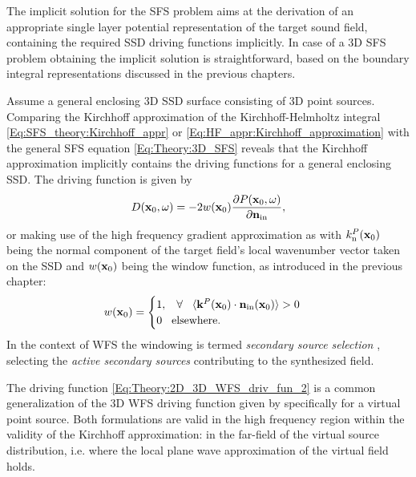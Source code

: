 The implicit solution for the SFS problem aims at the derivation of an appropriate single layer potential representation of the target sound field, containing the required SSD driving functions implicitly.
In case of a 3D SFS problem obtaining the implicit solution is straightforward, based on the boundary integral representations discussed in the previous chapters.

Assume a general enclosing 3D SSD surface consisting of 3D point sources.
Comparing the Kirchhoff approximation of the Kirchhoff-Helmholtz integral \eqref{Eq:SFS_theory:Kirchhoff_appr} or \eqref{Eq:HF_appr:Kirchhoff_approximation} with the general SFS equation \eqref{Eq:Theory:3D_SFS} reveals that the Kirchhoff approximation implicitly contains the driving functions for a general enclosing SSD. 
The driving function is given by
\begin{equation}
D(\mathbf{x}_0,\omega) = - 2w(\mathbf{x}_0)\frac{\partial P(\mathbf{x}_0,\omega)}{\partial \mathbf{n}_{\mathrm{in}}}, 
\label{Eq:Theory:2D_3D_WFS_driv_fun}
\end{equation}
or making use of the high frequency gradient approximation as
with $k_{\mathrm{n}}^P(\mathbf{x}_0)$ being the normal component of the target field's local wavenumber vector taken on the SSD and $w(\mathbf{x}_0)$ being the window function, as introduced in the previous chapter:
\begin{equation}
w(\mathbf{x}_0) = \begin{cases}
                        1, \hspace{3mm} \forall \hspace{3mm} \langle \mathbf{k}^P(\mathbf{x}_0) \cdot \mathbf{n}_{\text{in}}(\mathbf{x}_0) \rangle > 0 \\
                        0  \hspace{3mm} \text{elsewhere}.
                    \end{cases}
\end{equation}
In the context of WFS the windowing is termed \emph{secondary source selection} \cite{nicol19993d, Spors2007:DAGA:SS_selection_criterion, Spors2007}, selecting the \emph{active secondary sources} contributing to the synthesized field.

The driving function \eqref{Eq:Theory:2D_3D_WFS_driv_fun_2} is a common generalization of the 3D WFS driving function given by \cite[Eq. 20.]{Zotter2013:uniqueness} specifically for a virtual point source.
Both formulations are valid in the high frequency region within the validity of the Kirchhoff approximation: in the far-field of the virtual source distribution, i.e. where the local plane wave approximation of the virtual field holds.

